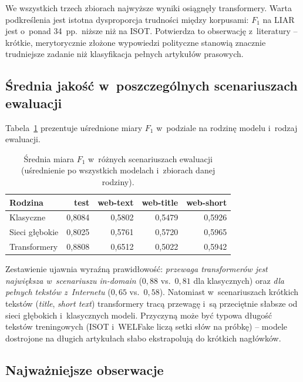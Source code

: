 \documentclass[oneside,polski,logo]{amuthesis}
\begin{document}
We wszystkich trzech zbiorach najwyższe wyniki osiągnęły transformery.
Warta podkreślenia jest istotna dysproporcja trudności między korpusami:
$F_1$ na LIAR jest o~ponad 34~pp.\ niższe niż na ISOT. Potwierdza to
obserwację z~literatury -- krótkie, merytorycznie złożone wypowiedzi
polityczne stanowią znacznie trudniejsze zadanie niż klasyfikacja
pełnych artykułów prasowych.

\subsection{Średnia jakość w~poszczególnych scenariuszach ewaluacji}
\label{sec:podsum_srednia}

Tabela~\ref{tab:podsum_srednia} prezentuje uśrednione miary $F_1$
w~podziale na rodzinę modelu i~rodzaj ewaluacji.

\begin{table}[ht]
\centering
\caption{Średnia miara $F_1$ w~różnych scenariuszach ewaluacji
(uśrednienie po wszystkich modelach i~zbiorach danej rodziny).}
\label{tab:podsum_srednia}
\begin{tabular}{lrrrr}
\toprule
Rodzina        & test     & web-text & web-title & web-short \\
\midrule
Klasyczne      & 0,8084 & 0,5802 & 0,5479 & 0,5926 \\
Sieci głębokie & 0,8025 & 0,5761 & 0,5720 & 0,5965 \\
Transformery   & 0,8808 & 0,6512 & 0,5022 & 0,5942 \\
\bottomrule
\end{tabular}
\end{table}

Zestawienie ujawnia wyraźną prawidłowość: \emph{przewaga transformerów
jest największa w~scenariuszu in-domain} (\(0{,}88\) vs.\ \(0{,}81\)
dla klasycznych) oraz \emph{dla pełnych tekstów z~Internetu}
(\(0{,}65\) vs.\ \(0{,}58\)). Natomiast
w~scenariuszach krótkich tekstów (\emph{title}, \emph{short text})
transformery tracą przewagę i~są przeciętnie słabsze od sieci głębokich
i~klasycznych modeli. Przyczyną może być typowa długość tekstów
treningowych (ISOT i~WELFake liczą setki słów na próbkę) -- modele
dostrojone na długich artykułach słabo ekstrapolują do krótkich nagłówków.

\subsection{Najważniejsze obserwacje}
\label{sec:podsum_obserwacje}
\end{document}
